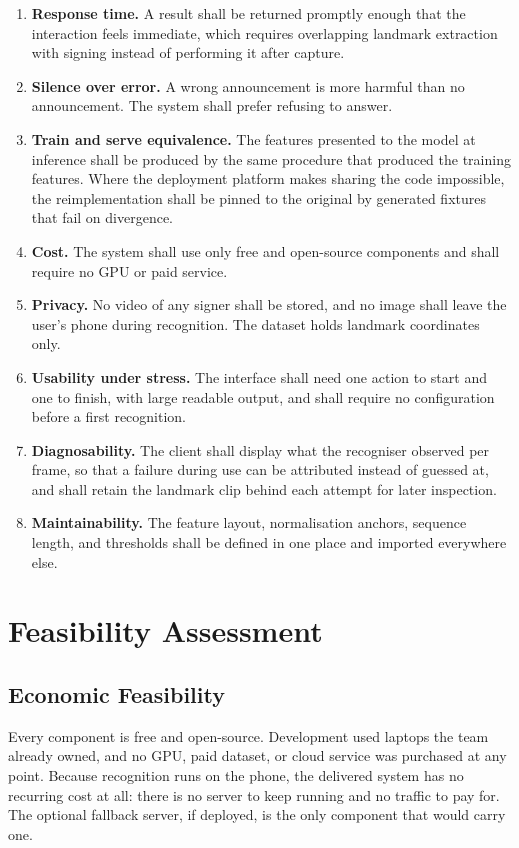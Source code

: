 \begin{enumerate}
    \item \textbf{Response time.} A result shall be returned promptly enough that the interaction feels immediate, which requires overlapping landmark extraction with signing instead of performing it after capture.
    \item \textbf{Silence over error.} A wrong announcement is more harmful than no announcement. The system shall prefer refusing to answer.
    \item \textbf{Train and serve equivalence.} The features presented to the model at inference shall be produced by the same procedure that produced the training features. Where the deployment platform makes sharing the code impossible, the reimplementation shall be pinned to the original by generated fixtures that fail on divergence.
    \item \textbf{Cost.} The system shall use only free and open-source components and shall require no GPU or paid service.
    \item \textbf{Privacy.} No video of any signer shall be stored, and no image shall leave the user's phone during recognition. The dataset holds landmark coordinates only.
    \item \textbf{Usability under stress.} The interface shall need one action to start and one to finish, with large readable output, and shall require no configuration before a first recognition.
    \item \textbf{Diagnosability.} The client shall display what the recogniser observed per frame, so that a failure during use can be attributed instead of guessed at, and shall retain the landmark clip behind each attempt for later inspection.
    \item \textbf{Maintainability.} The feature layout, normalisation anchors, sequence length, and thresholds shall be defined in one place and imported everywhere else.
\end{enumerate}

\section{Feasibility Assessment}

\subsection{Economic Feasibility}
Every component is free and open-source. Development used laptops the team already owned, and no GPU, paid dataset, or cloud service was purchased at any point. Because recognition runs on the phone, the delivered system has no recurring cost at all: there is no server to keep running and no traffic to pay for. The optional fallback server, if deployed, is the only component that would carry one.

